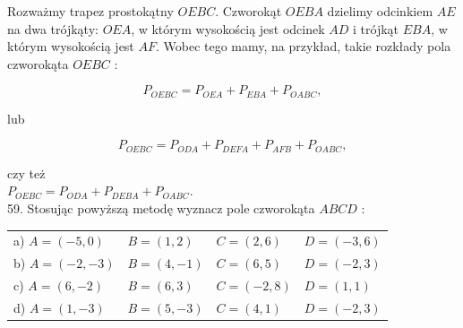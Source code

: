 \documentclass[10pt]{article}
\begin{document}
Rozważmy trapez prostokątny \(O E B C\). Czworokąt \(O E B A\) dzielimy odcinkiem \(A E\) na dwa trójkąty: \(O E A\), w którym wysokością jest odcinek \(A D\) i trójkąt \(E B A\), w którym wysokością jest \(A F\). Wobec tego mamy, na przykład, takie rozkłady pola czworokąta \(O E B C\) :

\[
P_{O E B C}=P_{O E A}+P_{E B A}+P_{O A B C},
\]

lub

\[
P_{O E B C}=P_{O D A}+P_{D E F A}+P_{A F B}+P_{O A B C},
\]

czy też\\
\(P_{O E B C}=P_{O D A}+P_{D E B A}+P_{O A B C}\).\\
59. Stosując powyższą metodę wyznacz pole czworokąta \(A B C D\) :

\begin{center}
\begin{tabular}{llll}
a) \(A=(-5,0)\) & \(B=(1,2)\) & \(C=(2,6)\) & \(D=(-3,6)\) \\
b) \(A=(-2,-3)\) & \(B=(4,-1)\) & \(C=(6,5)\) & \(D=(-2,3)\) \\
c) \(A=(6,-2)\) & \(B=(6,3)\) & \(C=(-2,8)\) & \(D=(1,1)\) \\
d) \(A=(1,-3)\) & \(B=(5,-3)\) & \(C=(4,1)\) & \(D=(-2,3)\) \\
\end{tabular}
\end{center}
\end{document}
